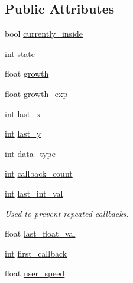 \subsection*{Public Attributes}
\begin{DoxyCompactItemize}
\item 
bool \hyperlink{class_g_l_u_i___scrollbar_a143ab721307bb6333c74cad18ac7d07d}{currently\+\_\+inside}
\item 
\hyperlink{wglext_8h_a500a82aecba06f4550f6849b8099ca21}{int} \hyperlink{class_g_l_u_i___scrollbar_a2986ca89f150b32eab93e6724a8168a7}{state}
\item 
float \hyperlink{class_g_l_u_i___scrollbar_a7afb9f8788d3e9c1c5dc5668a06e0d1c}{growth}
\item 
float \hyperlink{class_g_l_u_i___scrollbar_aef25dbf49897d1a97d0a6e6419f44ec7}{growth\+\_\+exp}
\item 
\hyperlink{wglext_8h_a500a82aecba06f4550f6849b8099ca21}{int} \hyperlink{class_g_l_u_i___scrollbar_a90351bf785037ab1f13c20724065d369}{last\+\_\+x}
\item 
\hyperlink{wglext_8h_a500a82aecba06f4550f6849b8099ca21}{int} \hyperlink{class_g_l_u_i___scrollbar_a68785c6cf9be6f321b77b6d9104fd8d9}{last\+\_\+y}
\item 
\hyperlink{wglext_8h_a500a82aecba06f4550f6849b8099ca21}{int} \hyperlink{class_g_l_u_i___scrollbar_ab541530d2e7482a4bd3b35f938a5d3ae}{data\+\_\+type}
\item 
\hyperlink{wglext_8h_a500a82aecba06f4550f6849b8099ca21}{int} \hyperlink{class_g_l_u_i___scrollbar_ab4a3269a65ba4b64eb06e0eb6c63b7e0}{callback\+\_\+count}
\item 
\hyperlink{wglext_8h_a500a82aecba06f4550f6849b8099ca21}{int} \hyperlink{class_g_l_u_i___scrollbar_a0fdab119977f4ce65429287a140bc03a}{last\+\_\+int\+\_\+val}
\begin{DoxyCompactList}\small\item\em Used to prevent repeated callbacks. \end{DoxyCompactList}\item 
float \hyperlink{class_g_l_u_i___scrollbar_ae4de8bd3b194d8cdf020b81ee7b89d9f}{last\+\_\+float\+\_\+val}
\item 
\hyperlink{wglext_8h_a500a82aecba06f4550f6849b8099ca21}{int} \hyperlink{class_g_l_u_i___scrollbar_afef0631b46631c19c611d2dfbdc18037}{first\+\_\+callback}
\item 
float \hyperlink{class_g_l_u_i___scrollbar_adbe7ab0e108162ac4283cba69fa69409}{user\+\_\+speed}
\item 

\end{DoxyCompactItemize}
